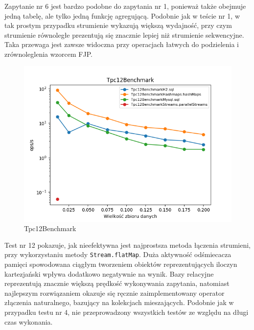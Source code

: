 \documentclass[12pt,twoside,openright]{extarticle}
\begin{document}
    Zapytanie nr 6 jest bardzo podobne do zapytania nr 1, ponieważ także obejmuje jedną tabelę, ale tylko jedną funkcję agregującą. Podobnie jak w teście nr 1, w tak prostym przypadku strumienie wykazują większą wydajność, przy czym strumienie równoległe prezentują się znacznie lepiej niż strumienie sekwencyjne. Taka przewaga jest zawsze widoczna przy operacjach łatwych do podzielenia i zrównoleglenia wzorcem FJP.

\newpage
\begin{figure}[H]
\centering
\includegraphics[width=15cm]{plots/Tpc12Benchmark}
\caption{Tpc12Benchmark}
\end{figure}

    Test nr 12 pokazuje, jak nieefektywna jest najprostsza metoda łączenia strumieni, przy wykorzystaniu metody \texttt{Stream.flatMap}. Duża aktywność odśmiecacza pamięci spowodowana ciągłym tworzeniem obiektów reprezentujących iloczyn kartezjański wpływa dodatkowo negatywnie na wynik. Bazy relacyjne reprezentują znacznie większą prędkość wykonywania zapytania, natomiast najlepszym rozwiązaniem okazuje się ręcznie zaimplementowany operator złączenia naturalnego, bazujący na kolekcjach mieszających. Podobnie jak w przypadku testu nr 4, nie przeprowadzony wszystkich testów ze względu na długi czas wykonania.
\end{document}
